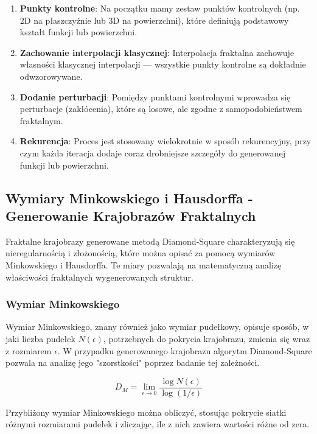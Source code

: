 \documentclass{article}
\begin{document}
\begin{enumerate}
    \item \textbf{Punkty kontrolne}: Na początku mamy zestaw punktów kontrolnych (np. 2D na płaszczyźnie lub 3D na powierzchni), które definiują podstawowy kształt funkcji lub powierzchni.
    \item \textbf{Zachowanie interpolacji klasycznej}: Interpolacja fraktalna zachowuje własności klasycznej interpolacji — wszystkie punkty kontrolne są dokładnie odwzorowywane.
    \item \textbf{Dodanie perturbacji}: Pomiędzy punktami kontrolnymi wprowadza się perturbacje (zakłócenia), które są losowe, ale zgodne z samopodobieństwem fraktalnym.
    \item \textbf{Rekurencja}: Proces jest stosowany wielokrotnie w sposób rekurencyjny, przy czym każda iteracja dodaje coraz drobniejsze szczegóły do generowanej funkcji lub powierzchni.
\end{enumerate}

\vspace{0.5cm}

\subsection{Wymiary Minkowskiego i Hausdorffa - Generowanie Krajobrazów Fraktalnych}

Fraktalne krajobrazy generowane metodą Diamond-Square charakteryzują się nieregularnością i złożonością, które można opisać za pomocą wymiarów Minkowskiego i Hausdorffa. Te miary pozwalają na matematyczną analizę właściwości fraktalnych wygenerowanych struktur.

\subsubsection*{Wymiar Minkowskiego}

Wymiar Minkowskiego, znany również jako wymiar pudełkowy, opisuje sposób, w jaki liczba pudełek \(N(\epsilon)\), potrzebnych do pokrycia krajobrazu, zmienia się wraz z rozmiarem \(\epsilon\). W przypadku generowanego krajobrazu algorytm Diamond-Square pozwala na analizę jego "szorstkości" poprzez badanie tej zależności.

\[
D_M = \lim_{\epsilon \to 0} \frac{\log N(\epsilon)}{\log(1/\epsilon)}
\]

Przybliżony wymiar Minkowskiego można obliczyć, stosując pokrycie siatki różnymi rozmiarami pudełek i zliczając, ile z nich zawiera wartości różne od zera.
\end{document}
